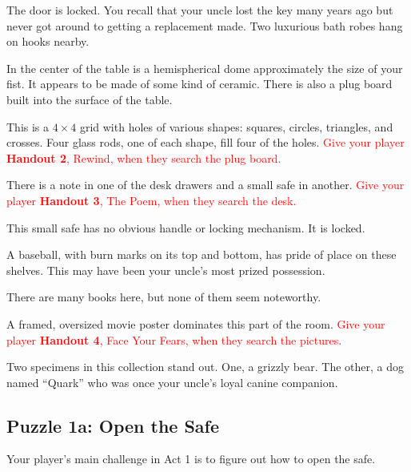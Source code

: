 \documentclass[a6paper, parskip=half, DIV=14, 12pt]{scrartcl}
\begin{document}
\begin{description}[leftmargin=0pt]
\item[Door (E)] The door is locked. You recall that your uncle lost the key many years ago but never got around to getting a replacement made. Two luxurious bath robes hang on hooks nearby.%
\item[Table (C)] In the center of the table is a hemispherical dome approximately the size of your fist. It appears to be made of some kind of ceramic.
There is also a plug board built into the surface of the table.
\item[Plug Board (C)] This is a $4 \times 4$ grid with holes of various shapes: squares, circles, triangles, and crosses. Four glass rods, one of each shape, fill four of the holes. \textcolor{Red}{Give your player \textbf{Handout 2}, Rewind, when they search the plug board.}
\item[Desk (W)] There is a note in one of the desk drawers and a small safe in another. \textcolor{Red}{Give your player \textbf{Handout 3}, The Poem, when they search the desk.}
\item[Safe (W)] This small safe has no obvious handle or locking mechanism. It is locked.
\item[Shelves (NW)] A baseball, with burn marks on its top and bottom, has pride of place on these shelves. This may have been your uncle's most prized possession.
\item[Bookcases (NE)] There are many books here, but none of them seem noteworthy.
\item[Pictures (SE)] A framed, oversized movie poster dominates this part of the room. \textcolor{Red}{Give your player \textbf{Handout 4}, Face Your Fears, when they search the pictures.}
\item[Animals (SW)] Two specimens in this collection stand out. One, a grizzly bear. The other, a dog named ``Quark'' who was once your uncle's loyal canine companion.
\end{description}

\subsection*{Puzzle 1a: Open the Safe}
Your player's main challenge in Act 1 is to figure out how to open the safe.
\end{document}
